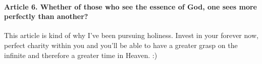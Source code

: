 \documentclass{ucetd}
\begin{document}
\paragraph{Article 6. Whether of those who see the essence of God, one sees more perfectly than another?}
This article is kind of why I've been pursuing holiness. Invest in your forever now, perfect charity within you and you'll be able to have a greater grasp on the infinite and therefore a greater time in Heaven. :)
\end{document}

